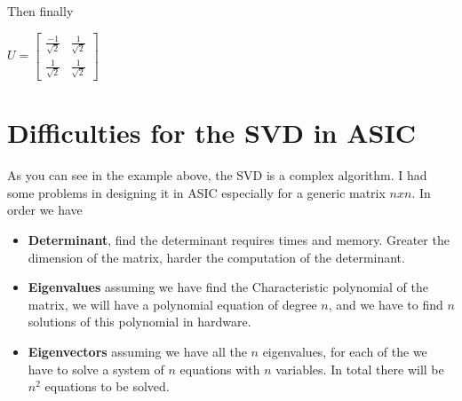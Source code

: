 Then finally 

\begin{center}
	$ U=\begin{bmatrix}
	\frac{-1}{\sqrt{2}} & \frac{1}{\sqrt{2}}\\
	\frac{1}{\sqrt{2}} & \frac{1}{\sqrt{2}}
	\end{bmatrix} $
\end{center}
\section{Difficulties for the SVD in ASIC}
As you can see in the example above, the SVD is a complex algorithm. I had some problems in designing it in ASIC especially for a generic matrix $ nxn $.
In order we have
\begin{itemize}
	\item \textbf{Determinant}, find the determinant requires times and memory. Greater the dimension of the matrix, harder the computation of the determinant.
	\item \textbf{Eigenvalues} assuming we have find the Characteristic polynomial of the matrix, we will have a polynomial equation of degree $ n $, and we have to find $ n $ solutions of this polynomial in hardware.
	\item \textbf{Eigenvectors} assuming we have all the $ n $ eigenvalues, for each of the we have to solve a system of $n$ equations with $n$ variables. In total there will be $n^2$ equations to be solved.
\end{itemize}
